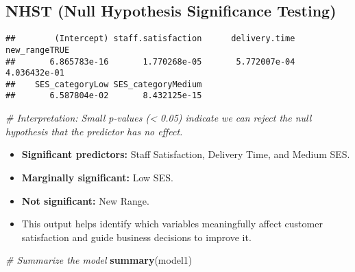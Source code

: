\documentclass[
]{article}
\newenvironment{Shaded}{\begin{snugshade}}{\end{snugshade}}
\newcommand{\CommentTok}[1]{\textcolor[rgb]{0.56,0.35,0.01}{\textit{#1}}}
\newcommand{\FunctionTok}[1]{\textcolor[rgb]{0.13,0.29,0.53}{\textbf{#1}}}
\newcommand{\NormalTok}[1]{#1}
\newcommand{\OtherTok}[1]{\textcolor[rgb]{0.56,0.35,0.01}{#1}}
\newcommand{\SpecialCharTok}[1]{\textcolor[rgb]{0.81,0.36,0.00}{\textbf{#1}}}
\newcommand{\StringTok}[1]{\textcolor[rgb]{0.31,0.60,0.02}{#1}}
\providecommand{\tightlist}{%
  \setlength{\itemsep}{0pt}\setlength{\parskip}{0pt}}
\begin{document}
\subsection{NHST (Null Hypothesis Significance
Testing)}\label{nhst-null-hypothesis-significance-testing-1}

\begin{Shaded}
\end{Shaded}

\begin{verbatim}
##        (Intercept) staff.satisfaction      delivery.time      new_rangeTRUE 
##       6.865783e-16       1.770268e-05       5.772007e-04       4.036432e-01 
##    SES_categoryLow SES_categoryMedium 
##       6.587804e-02       8.432125e-15
\end{verbatim}

\begin{Shaded}
\begin{Highlighting}[]
\CommentTok{\# Interpretation: Small p{-}values (\textless{} 0.05) indicate we can reject the null hypothesis that the predictor has no effect.}
\end{Highlighting}
\end{Shaded}

\begin{itemize}
\tightlist
\item
  \textbf{Significant predictors:} Staff Satisfaction, Delivery Time,
  and Medium SES.
\item
  \textbf{Marginally significant:} Low SES.
\item
  \textbf{Not significant:} New Range.
\item
  This output helps identify which variables meaningfully affect
  customer satisfaction and guide business decisions to improve it.
\end{itemize}

\begin{Shaded}
\begin{Highlighting}[]
\CommentTok{\# Summarize the model}
\FunctionTok{summary}\NormalTok{(model1)}
\end{Highlighting}
\end{Shaded}
\end{document}
